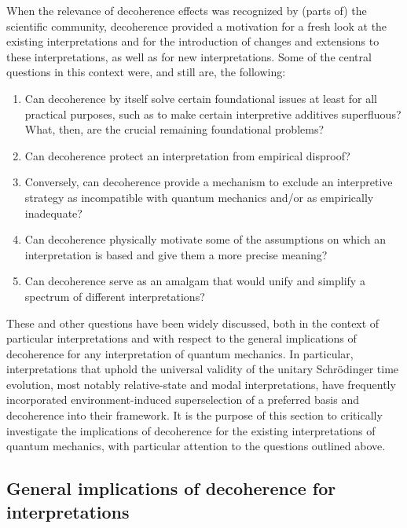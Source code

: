 \documentclass[twocolumn,rmp,aps,amsmath,amsfonts,noshowkeys,noshowpacs]{revtex4}
\begin{document}
When the relevance of decoherence effects was recognized by (parts of)
the scientific community, decoherence provided a motivation for a
fresh look at the existing interpretations and for the introduction of
changes and extensions to these interpretations, as well as for new
interpretations.  Some of the central questions in this context were,
and still are, the following:
%
\begin{enumerate} 
  
\item Can decoherence by itself solve certain foundational issues at
  least for all practical purposes, such as to make certain
  interpretive additives superfluous? What, then, are the crucial
  remaining foundational problems?
  
\item Can decoherence protect an interpretation from empirical
  disproof?
  
\item Conversely, can decoherence provide a mechanism to
  exclude an interpretive strategy as incompatible with
  quantum mechanics and/or as empirically inadequate?
  
\item Can decoherence physically motivate some of the assumptions on
  which an interpretation is based and give them a more precise
  meaning?
  
\item Can decoherence serve as an amalgam that would unify and
  simplify a spectrum of different interpretations?

\end{enumerate}
%
These and other questions have been widely discussed, both in the
context of particular interpretations and with respect to the general
implications of decoherence for any interpretation of quantum
mechanics.  In particular, interpretations that uphold the universal
validity of the unitary Schr\"odinger time evolution, most notably
relative-state and modal interpretations, have frequently incorporated
environment-induced superselection of a preferred basis and
decoherence into their framework. It is the purpose of this section to
critically investigate the implications of decoherence for the
existing interpretations of quantum mechanics, with particular
attention to the questions outlined above.


\subsection{General implications of decoherence for interpretations}
\end{document}
